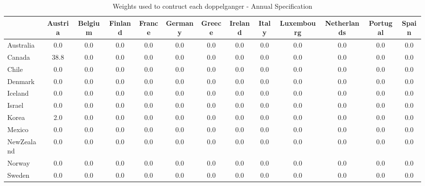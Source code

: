 \begin{table}[htbp]
\caption{\label{clabel} Weights used to contruct each doppelganger - Annual Specification}\centering\medskip
\begin{tabular}{lcccccccccccc} \hline \hline
 & Austria  & Belgium  & Finland  & France  & Germany  & Greece  & Ireland  & Italy  & Luxembourg  & Netherlands  & Portugal  & Spain  \\  \hline 
Australia &       0.0 &       0.0 &       0.0 &       0.0 &       0.0 &       0.0 &       0.0 &       0.0 &       0.0 &       0.0 &       0.0 &       0.0 \\  
Canada &      38.8 &       0.0 &       0.0 &       0.0 &       0.0 &       0.0 &       0.0 &       0.0 &       0.0 &       0.0 &       0.0 &       0.0 \\  
Chile &       0.0 &       0.0 &       0.0 &       0.0 &       0.0 &       0.0 &       0.0 &       0.0 &       0.0 &       0.0 &       0.0 &       0.0 \\  
Denmark &       0.0 &       0.0 &       0.0 &       0.0 &       0.0 &       0.0 &       0.0 &       0.0 &       0.0 &       0.0 &       0.0 &       0.0 \\  
Iceland &       0.0 &       0.0 &       0.0 &       0.0 &       0.0 &       0.0 &       0.0 &       0.0 &       0.0 &       0.0 &       0.0 &       0.0 \\  
Israel &       0.0 &       0.0 &       0.0 &       0.0 &       0.0 &       0.0 &       0.0 &       0.0 &       0.0 &       0.0 &       0.0 &       0.0 \\  
Korea &       2.0 &       0.0 &       0.0 &       0.0 &       0.0 &       0.0 &       0.0 &       0.0 &       0.0 &       0.0 &       0.0 &       0.0 \\  
Mexico &       0.0 &       0.0 &       0.0 &       0.0 &       0.0 &       0.0 &       0.0 &       0.0 &       0.0 &       0.0 &       0.0 &       0.0 \\  
NewZealand &       0.0 &       0.0 &       0.0 &       0.0 &       0.0 &       0.0 &       0.0 &       0.0 &       0.0 &       0.0 &       0.0 &       0.0 \\  
Norway &       0.0 &       0.0 &       0.0 &       0.0 &       0.0 &       0.0 &       0.0 &       0.0 &       0.0 &       0.0 &       0.0 &       0.0 \\  
Sweden &       0.0 &       0.0 &       0.0 &       0.0 &       0.0 &       0.0 &       0.0 &       0.0 &       0.0 &       0.0 &       0.0 &       0.0 \\  

\end{tabular}
\end{table}

